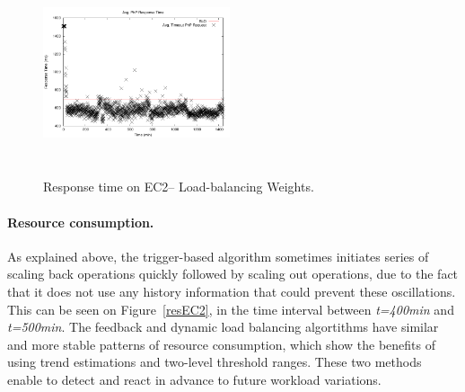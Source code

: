 \begin{figure}[tbp]
\begin{center}
\includegraphics[width=0.49\textwidth, height=6cm]{./images/heterogeneous/avgTimeout_PhP_DLBweights}
\end{center}
\vspace{-5mm}
\caption{Response time on EC2-- Load-balancing Weights.}
\label{historyWeightEC2}
\end{figure}

\paragraph{Resource consumption.}
As explained above, the trigger-based algorithm sometimes initiates
series of scaling back operations quickly followed by scaling out operations, 
due to the fact that it does not use any history information that could
prevent these oscillations. This can be seen on Figure~\ref{resEC2},
in the time interval between \emph{t=400min} and \emph{t=500min}.
The feedback and dynamic load balancing algortithms have similar
and more stable patterns of resource consumption, which show the
benefits of using trend estimations and two-level threshold ranges. These two methods enable
to detect and react in advance to future workload variations.



